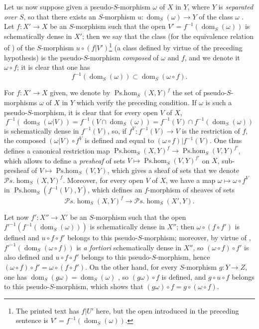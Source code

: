 \begin{env}[20.3.2]
\label{IV.20.3.2}
Let us now suppose given a pseudo-$S$-morphism $\omega$ of $X$ in $Y$, where $Y$ is \emph{separated over $S$}, so that there exists an $S$-morphism $u:\operatorname{dom}_S(\omega)\to Y$ of the class $\omega$ .
Let $f:X'\to X$ be an $S$-morphism such that the open $V'=f^{-1}(\operatorname{dom}_S(\omega))$ is schematically dense in $X'$;
then we say that the class (for the equivalence relation of ) of the $S$-morphism $u\circ(f|V')$\footnote{The printed text has $f|U'$ here, but the open introduced in the preceding sentence is $V'=f^{-1}(\operatorname{dom}_S(\omega))$.} (a class defined by virtue of the preceding hypothesis) is the pseudo-$S$-morphism \emph{composed} of $\omega$ and $f$, and we denote it $\omega\circ f$;
it is clear that one has
\[
\label{IV.20.3.2.1}
  f^{-1}(\operatorname{dom}_S(\omega))\subset\operatorname{dom}_S(\omega\circ f).
  \tag{20.3.2.1}
\]

For $f:X'\to X$ given, we denote by $\operatorname{Ps.hom}_S(X,Y)^f$ the set of pseudo-$S$-morphisms $\omega$ of $X$ in $Y$ which verify the preceding condition.
If $\omega$ is such a pseudo-$S$-morphism, it is clear that for every open $V$ of $X$,
\[
  f^{-1}(\operatorname{dom}_S(\omega|V))=f^{-1}(V\cap\operatorname{dom}_S(\omega))=f^{-1}(V)\cap f^{-1}(\operatorname{dom}_S(\omega))
\]
is schematically dense in $f^{-1}(V)$, so, if $f^V:f^{-1}(V)\to V$ is the restriction of $f$, the composed $(\omega|V)\circ f^V$ is defined and equal to $(\omega\circ f)|f^{-1}(V)$.
One thus defines a canonical restriction map $\operatorname{Ps.hom}_S(X,Y)^f\to\operatorname{Ps.hom}_S(V,Y)^{f'}$, which
allows to define a \emph{presheaf} of sets $V\mapsto\operatorname{Ps.hom}_S(V,Y)^{f'}$ on $X$, sub-presheaf of $V\mapsto\operatorname{Ps.hom}_S(V,Y)$, which gives a sheaf of sets that we denote $\mathscr{P}\!s.\!\operatorname{hom}_S(X,Y)^f$.
Moreover, for every open $V$ of $X$, we have a map $\omega\mapsto\omega\circ f^V$ in $\operatorname{Ps.hom}_S(f^{-1}(V),Y)$, which defines an $f$-morphism of sheaves of sets
\[
  \mathscr{P}\!s.\!\operatorname{hom}_S(X,Y)^f\to\mathscr{P}\!s.\!\operatorname{hom}_S(X',Y).
\]
\end{env}

\begin{env}[20.3.3]
\label{IV.20.3.3}
Let now $f':X''\to X'$ be an $S$-morphism such that the open $f'^{-1}(f^{-1}(\operatorname{dom}_S(\omega)))$ is schematically dense in $X''$;
then $\omega\circ(f\circ f')$ is defined and $u\circ f\circ f'$ belongs to this pseudo-$S$-morphism;
moreover, by virtue of , $f'^{-1}(\operatorname{dom}_S(\omega\circ f))$ is \emph{a fortiori} schematically dense in $X''$, so $(\omega\circ f)\circ f'$ is also defined and $u\circ f\circ f'$ belongs to this pseudo-$S$-morphism, hence $(\omega\circ f)\circ f'=\omega\circ(f\circ f')$.
On the other hand, for every $S$-morphism $g:Y\to Z$, one has $\operatorname{dom}_S(g\omega)=\operatorname{dom}_S(\omega)$ , so $(g\omega)\circ f$ is defined, and $g\circ u\circ f$ belongs to this pseudo-$S$-morphism, which shows that $(g\omega)\circ f=g\circ(\omega\circ f)$.
\end{env}

